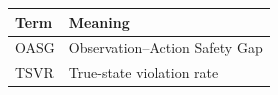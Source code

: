 \begin{tabular}{ll}Term & Meaning\\\midrule OASG & Observation--Action Safety Gap\\ TSVR & True-state violation rate\\\end{tabular}
